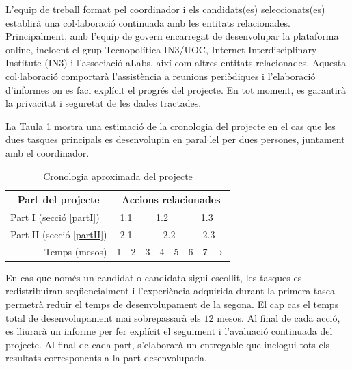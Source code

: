 \documentclass[final,10pt]{article}
\begin{document}
L'equip de treball format pel coordinador i els candidats(es) seleccionats(es) establir\`a una col$\cdot$laboraci\'o continuada amb les entitats relacionades. Principalment, amb l'equip de govern encarregat de desenvolupar
la plataforma online, incloent el grup Tecnopol\'itica IN3/UOC, Internet Interdisciplinary Institute (IN3) i l'associaci\'o aLabs, aix\'i com
altres entitats relacionades. Aquesta col$\cdot$laboraci\'o comportar\`a l'assist\`encia a reunions peri\`odiques i l'elaboraci\'o d'informes on es faci expl\'icit el progr\'es del projecte.
En tot moment, es garantir\`a la privacitat i seguretat de les dades tractades.

La Taula \ref{crono} mostra una estimaci\'o de la cronologia del projecte en el cas que les dues tasques
principals es desenvolupin en paral$\cdot$lel per dues persones, juntament amb el coordinador.
\begin{table}[!h]
\centering
\caption{Cronologia aproximada del projecte}
\label{crono}
\begin{tabular}{|l|l|l|l|l|l|l|l|}
\hline
\multicolumn{1}{|c|}{\textbf{Part del projecte}}       & \multicolumn{7}{c|}{\textbf{Accions relacionades}}                                                                                                                                                        \\ \hline
Part I (secci\'o \ref{partI})    & \multicolumn{2}{c|}{\cellcolor[HTML]{34CDF9}1.1} & \multicolumn{3}{|c|}{\cellcolor[HTML]{96FFFB}1.2} & \multicolumn{2}{c|}{\cellcolor[HTML]{67FD9A}1.3}\\ \hline
Part II (secci\'o \ref{partII}) & \multicolumn{2}{c|}{\cellcolor[HTML]{34CDF9}2.1}   & \multicolumn{4}{|c|}{\cellcolor[HTML]{96FFFB}2.2}               & \cellcolor[HTML]{9AFF99}2.3\\ \hline
\multicolumn{1}{|r|}{Temps (mesos)}                    &      1                            &2                                 &3                      &4                     &5                     &6             &7 $\rightarrow$                                                    \\ \hline
\end{tabular}
\end{table}

En cas que nom\'es un candidat o candidata sigui escollit, les tasques es redistribuiran seq\"uencialment i l'experi\`encia
adquirida durant la primera tasca permetr\`a reduir el temps de desenvolupament de la segona.
El cap cas el temps total de desenvolupament mai sobrepassar\`a els $12$ mesos.
Al final de cada acci\'o, es lliurar\`a un informe per fer expl\'icit el seguiment i l'avaluaci\'o continuada del projecte.
Al final de cada part, s'elaborar\`a un entregable que inclogui tots els resultats corresponents a la part desenvolupada.
\end{document}
